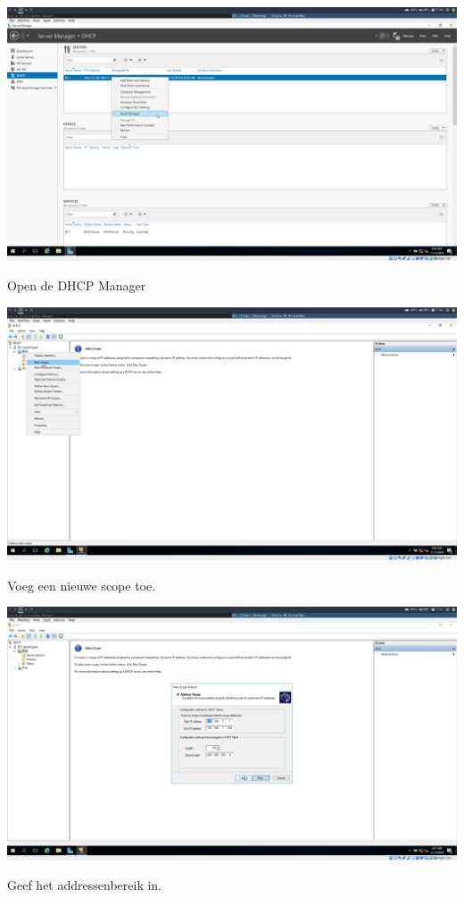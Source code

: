 \documentclass[a4paper]{article}
\begin{document}
\begin{center}
	\includegraphics[width=15cm]{Pictures/DC1/DHCP/1542300003.png}
	
	Open de DHCP Manager
\end{center}
\begin{center}
	\includegraphics[width=15cm]{Pictures/DC1/DHCP/1542300021.png}
	
	Voeg een nieuwe scope toe.
\end{center}
\begin{center}
	\includegraphics[width=15cm]{Pictures/DC1/DHCP/1542300063.png}
	
	Geef het addressenbereik in.
\end{center}
\end{document}
